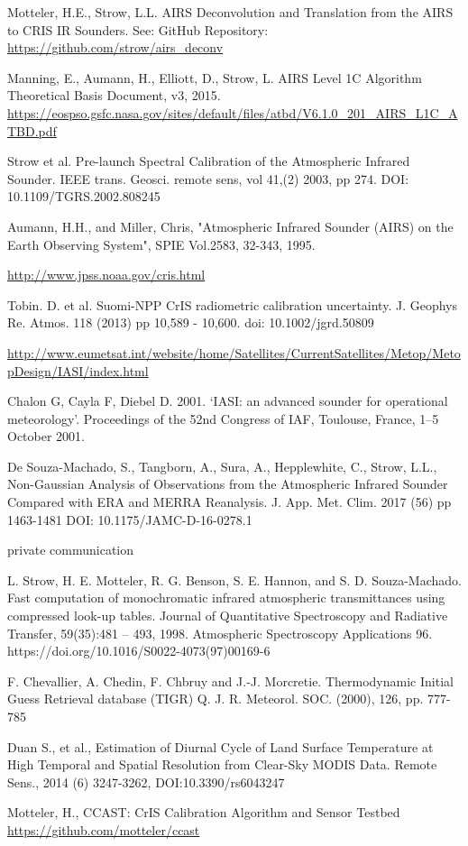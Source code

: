 \documentclass[twocolumn,10pt]{article}
\begin{document}
\begin{thebibliography}{9}
  Motteler, H.E., Strow, L.L.
  AIRS Deconvolution and Translation from the AIRS to CRIS IR Sounders. See:
  GitHub Repository:
  \url{https://github.com/strow/airs_deconv}

  Manning, E., Aumann, H., Elliott, D., Strow, L.
  AIRS Level 1C Algorithm Theoretical Basis Document, v3, 2015.
\url{https://eospso.gsfc.nasa.gov/sites/default/files/atbd/V6.1.0_201_AIRS_L1C_ATBD.pdf}
  
  Strow et al. 
  Pre-launch Spectral Calibration of the Atmospheric Infrared Sounder.
  IEEE trans. Geosci. remote sens,
  vol 41,(2) 2003, pp 274.
  DOI: 10.1109/TGRS.2002.808245

  Aumann, H.H., and Miller, Chris, 
  "Atmospheric Infrared Sounder (AIRS) on the Earth Observing System", 
  SPIE Vol.2583, 32-343, 1995.

 \url{http://www.jpss.noaa.gov/cris.html}

  Tobin. D. et al.
  Suomi-NPP CrIS radiometric calibration uncertainty.
  J. Geophys Re. Atmos. 118 (2013) pp 10,589 - 10,600.
  doi: 10.1002/jgrd.50809

  \url{http://www.eumetsat.int/website/home/Satellites/CurrentSatellites/Metop/MetopDesign/IASI/index.html}

  Chalon G, Cayla F, Diebel D. 2001. 
  ‘IASI: an advanced sounder for operational meteorology’. 
  Proceedings of the 52nd Congress of IAF, Toulouse, France, 1–5 October 2001.

  De Souza-Machado, S., Tangborn, A., Sura, A., Hepplewhite, C., Strow, L.L.,
  Non-Gaussian Analysis of Observations from the Atmospheric Infrared Sounder Compared with ERA and MERRA Reanalysis.
  J. App. Met. Clim. 2017 (56) pp 1463-1481
  DOI: 10.1175/JAMC-D-16-0278.1
  
  private communication

  L. Strow, H. E. Motteler, R. G. Benson, S. E. Hannon, and S. D. Souza-Machado. 
  Fast computation of monochromatic infrared atmospheric transmittances using compressed look-up tables. 
  Journal of Quantitative Spectroscopy and Radiative Transfer, 59(35):481 – 493, 1998. 
  Atmospheric Spectroscopy Applications 96.
  https://doi.org/10.1016/S0022-4073(97)00169-6

  F. Chevallier, A. Chedin, F. Chbruy and J.-J. Morcretie.
  Thermodynamic Initial Guess Retrieval database  (TIGR) 
  Q. J. R. Meteorol. SOC. (2000), 126, pp.  777-785

  Duan S., et al.,
  Estimation of Diurnal Cycle of Land Surface Temperature at High Temporal and Spatial Resolution from Clear-Sky MODIS Data.
  Remote Sens., 2014 (6) 3247-3262,
  DOI:10.3390/rs6043247

  Motteler, H.,
  CCAST: CrIS Calibration Algorithm and Sensor Testbed 
  \url{https://github.com/motteler/ccast}
  
\end{thebibliography}
\end{document}
